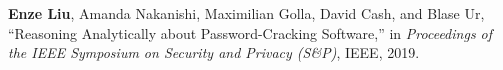 \documentclass[12pt]{ucsddissertation}
\begin{document}
\begin{vita}
\noindent \textbf{Enze Liu}, Amanda Nakanishi, Maximilian Golla, David Cash, and Blase Ur, ``Reasoning Analytically about Password-Cracking Software,'' in \textit{Proceedings of the IEEE Symposium on Security and Privacy (S\&P)}, IEEE, 2019.\\





\end{vita}
\end{document}
